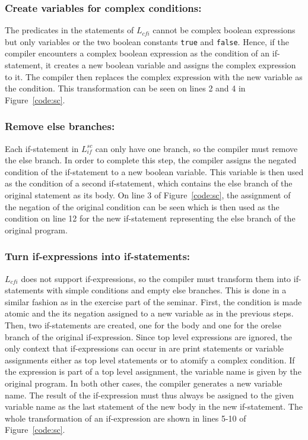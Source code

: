\subsubsection{Create variables for complex conditions:}
The predicates in the statements of $L_{cfi}$ cannot be complex boolean expressions but only variables or the two boolean constants \texttt{true} and \texttt{false}.
Hence, if the compiler encounters a complex boolean expression as the condition of an if-statement, it creates a new boolean variable and assigns the complex expression to it. 
The compiler then replaces the complex expression with the new variable as the condition.
This transformation can be seen on lines 2 and 4 in Figure~\ref{code:sc}.

\subsubsection{Remove else branches:}
Each if-statement in $L_{if}^{sc}$ can only have one branch, so the compiler must remove the else branch.
In order to complete this step, the compiler assigns the negated condition of the if-statement to a new boolean variable.
This variable is then used as the condition of a second if-statement, which contains the else branch of the original statement as its body.
On line 3 of Figure~\ref{code:sc}, the assignment of the negation of the original condition can be seen which is then used as the condition on line 12 for the new if-statement representing the else branch of the original program.

\subsubsection{Turn if-expressions into if-statements:}
$L_{cfi}$ does not support if-expressions, so the compiler must transform them into if-statements with simple conditions and empty else branches. This is done in a similar fashion as in the exercise part of the seminar.
First, the condition is made atomic and the its negation assigned to a new variable as in the previous steps.
Then, two if-statements are created, one for the body and one for the orelse branch of the original if-expression.
Since top level expressions are ignored, the only context that if-expressions can occur in are print statements or variable assignments either as top level statements or to atomify a complex condition.
If the expression is part of a top level assignment, the variable name is given by the original program. In both other cases, the compiler generates a new variable name.
The result of the if-expression must thus always be assigned to the given variable name as the last statement of the new body in the new if-statement.
The whole transformation of an if-expression are shown in lines 5-10 of Figure~\ref{code:sc}.


